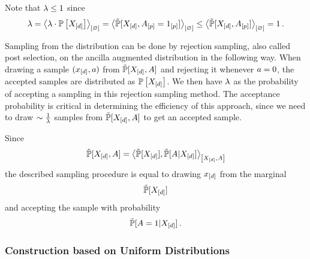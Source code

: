 Note that $\lambda\leq1$ since
\begin{align*}
    \lambda
    = \left\langle \lambda \cdot \mathbb{P}\left[X_{[d]}\right]\right\rangle_{\left[ \varnothing \right]}
    = \left\langle \tilde{\mathbb{P}}[X_{[d]},A_{[p]}=1_{[p]}]\right\rangle_{\left[ \varnothing \right]}
    \leq \left\langle \tilde{\mathbb{P}}[X_{[d]},A_{[p]}]\right\rangle_{\left[ \varnothing \right]} = 1 \, .
\end{align*}

Sampling from the distribution can be done by rejection sampling, also called post selection, on the ancilla augmented distribution in the following way.
When drawing a sample $(x_{[d]},a)$ from $\tilde{\mathbb{P}}[X_{[d]},A]$ and rejecting it whenever $a=0$, the accepted samples are distributed as $\mathbb{P}\left[X_{[d]}\right]$.
We then have $\lambda$ as the probability of accepting a sampling in this rejection sampling method.
The acceptance probability is critical in determining the efficiency of this approach, since we need to draw $\sim\frac{1}{\lambda}$ samples from $\tilde{\mathbb{P}}[X_{[d]},A]$ to get an accepted sample.

Since
\begin{align}
    \label{eq:ancillaDecomposition}
    \tilde{\mathbb{P}}[X_{[d]},A]
    = \left\langle 
        \tilde{\mathbb{P}}[X_{[d]}],
        \tilde{\mathbb{P}}[A|X_{[d]}]
    \right\rangle_{\left[ X_{[d]},A \right]}
\end{align}
the described sampling procedure is equal to drawing $x_{[d]}$ from the marginal
\begin{align*}
    \tilde{\mathbb{P}}[X_{[d]}]
\end{align*}
and accepting the sample with probability
\begin{align*}
    \tilde{\mathbb{P}}[A=1|X_{[d]}]\, .
\end{align*}

\subsubsection{Construction based on Uniform Distributions}

